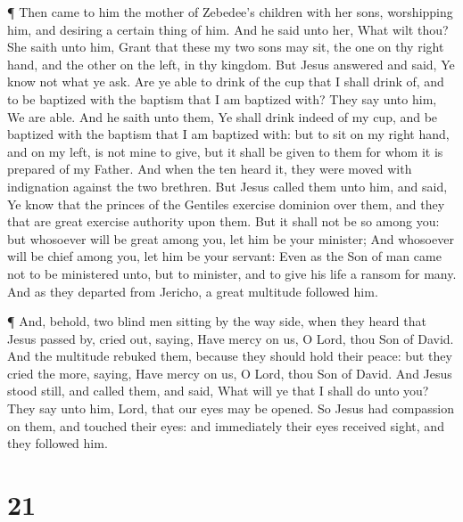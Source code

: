  ¶ Then came to him the mother of Zebedee's children with
her sons, worshipping him, and desiring a certain thing of him.
 And he said unto her, What wilt thou? She saith unto him,
Grant that these my two sons may sit, the one on thy right hand, and the
other on the left, in thy kingdom.  But Jesus answered and
said, Ye know not what ye ask. Are ye able to drink of the cup that I
shall drink of, and to be baptized with the baptism that I am baptized
with? They say unto him, We are able.  And he saith unto
them, Ye shall drink indeed of my cup, and be baptized with the baptism
that I am baptized with: but to sit on my right hand, and on my left, is
not mine to give, but it shall be given to them for whom it is prepared
of my Father.  And when the ten heard it, they were moved
with indignation against the two brethren.  But Jesus
called them unto him, and said, Ye know that the princes of the Gentiles
exercise dominion over them, and they that are great exercise authority
upon them.  But it shall not be so among you: but whosoever
will be great among you, let him be your minister;  And
whosoever will be chief among you, let him be your servant:
 Even as the Son of man came not to be ministered unto, but
to minister, and to give his life a ransom for many.  And
as they departed from Jericho, a great multitude followed him.

 ¶ And, behold, two blind men sitting by the way side, when
they heard that Jesus passed by, cried out, saying, Have mercy on us, O
Lord, thou Son of David.  And the multitude rebuked them,
because they should hold their peace: but they cried the more, saying,
Have mercy on us, O Lord, thou Son of David.  And Jesus
stood still, and called them, and said, What will ye that I shall do
unto you?  They say unto him, Lord, that our eyes may be
opened.  So Jesus had compassion on them, and touched their
eyes: and immediately their eyes received sight, and they followed him.

\hypertarget{section-20}{%
\section{21}\label{section-20}}

